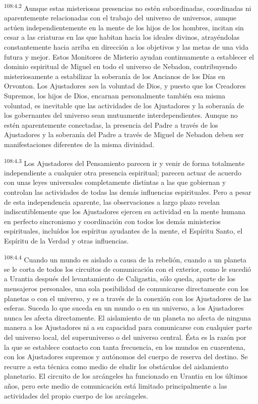 \par
\textsuperscript{108:4.2} Aunque estas misteriosas presencias no estén subordinadas, coordinadas ni aparentemente relacionadas con el trabajo del universo de universos, aunque actúen independientemente en la mente de los hijos de los hombres, incitan sin cesar a las criaturas en las que habitan hacia los ideales divinos, atrayéndolas constantemente hacia arriba en dirección a los objetivos y las metas de una vida futura y mejor. Estos Monitores de Misterio ayudan continuamente a establecer el dominio espiritual de Miguel en todo el universo de Nebadon, contribuyendo misteriosamente a estabilizar la soberanía de los Ancianos de los Días en Orvonton. Los Ajustadores \textit{son} la voluntad de Dios, y puesto que los Creadores Supremos, los hijos de Dios, encarnan personalmente también esa misma voluntad, es inevitable que las actividades de los Ajustadores y la soberanía de los gobernantes del universo sean mutuamente interdependientes. Aunque no estén aparentemente conectadas, la presencia del Padre a través de los Ajustadores y la soberanía del Padre a través de Miguel de Nebadon deben ser manifestaciones diferentes de la misma divinidad.

\par
\textsuperscript{108:4.3} Los Ajustadores del Pensamiento parecen ir y venir de forma totalmente independiente a cualquier otra presencia espiritual; parecen actuar de acuerdo con unas leyes universales completamente distintas a las que gobiernan y controlan las actividades de todas las demás influencias espirituales. Pero a pesar de esta independencia aparente, las observaciones a largo plazo revelan indiscutiblemente que los Ajustadores ejercen su actividad en la mente humana en perfecto sincronismo y coordinación con todos los demás ministerios espirituales, incluídos los espíritus ayudantes de la mente, el Espíritu Santo, el Espíritu de la Verdad y otras influencias.

\par
\textsuperscript{108:4.4} Cuando un mundo es aislado a causa de la rebelión, cuando a un planeta se le corta de todos los circuitos de comunicación con el exterior, como le sucedió a Urantia después del levantamiento de Caligastia, sólo queda, aparte de los mensajeros personales, una sola posibilidad de comunicarse directamente con los planetas o con el universo, y es a través de la conexión con los Ajustadores de las esferas. Suceda lo que suceda en un mundo o en un universo, a los Ajustadores nunca les afecta directamente. El aislamiento de un planeta no afecta de ninguna manera a los Ajustadores ni a su capacidad para comunicarse con cualquier parte del universo local, del superuniverso o del universo central. Ésta es la razón por la que se establece contacto con tanta frecuencia, en los mundos en cuarentena, con los Ajustadores supremos y autónomos del cuerpo de reserva del destino. Se recurre a esta técnica como medio de eludir los obstáculos del aislamiento planetario. El circuito de los arcángeles ha funcionado en Urantia en los últimos años, pero este medio de comunicación está limitado principalmente a las actividades del propio cuerpo de los arcángeles.

